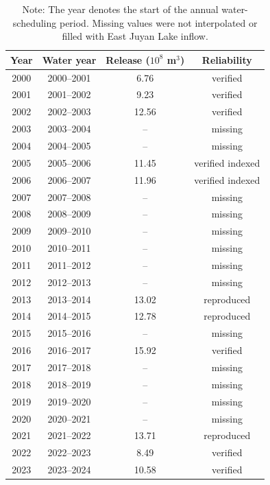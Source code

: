 \documentclass[12pt,a4paper]{article}
\begin{document}
\begin{table}[H]
	\centering
	\caption{Annual Zhengyixia release used for the lower Heihe descriptive comparison. Missing water years are retained as missing.}
	\label{tab:s6_heihe_water}
	\footnotesize
	\begin{tabular}{cccc}
		\toprule
		Year & Water year & Release ($10^8$ m$^3$) & Reliability \\
		\midrule
		2000 & 2000--2001 & 6.76 & verified \\
		2001 & 2001--2002 & 9.23 & verified \\
		2002 & 2002--2003 & 12.56 & verified \\
		2003 & 2003--2004 & -- & missing \\
		2004 & 2004--2005 & -- & missing \\
		2005 & 2005--2006 & 11.45 & verified indexed \\
		2006 & 2006--2007 & 11.96 & verified indexed \\
		2007 & 2007--2008 & -- & missing \\
		2008 & 2008--2009 & -- & missing \\
		2009 & 2009--2010 & -- & missing \\
		2010 & 2010--2011 & -- & missing \\
		2011 & 2011--2012 & -- & missing \\
		2012 & 2012--2013 & -- & missing \\
		2013 & 2013--2014 & 13.02 & reproduced \\
		2014 & 2014--2015 & 12.78 & reproduced \\
		2015 & 2015--2016 & -- & missing \\
		2016 & 2016--2017 & 15.92 & verified \\
		2017 & 2017--2018 & -- & missing \\
		2018 & 2018--2019 & -- & missing \\
		2019 & 2019--2020 & -- & missing \\
		2020 & 2020--2021 & -- & missing \\
		2021 & 2021--2022 & 13.71 & reproduced \\
		2022 & 2022--2023 & 8.49 & verified \\
		2023 & 2023--2024 & 10.58 & verified \\
		\bottomrule
	\end{tabular}
	\caption*{Note: The year denotes the start of the annual water-scheduling period. Missing values were not interpolated or filled with East Juyan Lake inflow.}
\end{table}
\end{document}

